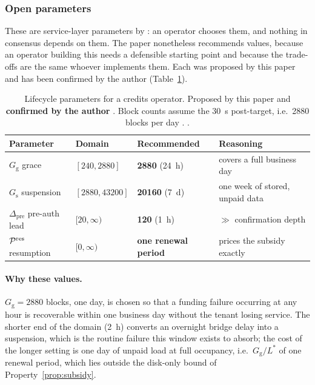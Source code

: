 \subsubsection{Open parameters}
\label{sec:paying:open}

These are service-layer parameters by : an operator chooses them, and
nothing in consensus depends on them. The paper nonetheless recommends values, because an operator
building this needs a defensible starting point and because the trade-offs are the same whoever
implements them. Each was proposed by this paper and has been confirmed by the author
(Table~\ref{tab:credit-params}).

\begin{table}[H]
\centering\footnotesize
\caption{Lifecycle parameters for a credits operator. Proposed by this paper and \textbf{confirmed
by the author} . Block counts assume the
\SI{30}{\second} post-\PoN target, i.e.\ \num{2880} blocks per day
. \planned.}
\label{tab:credit-params}
\begin{tabular}{@{}llll@{}}
\toprule
Parameter & Domain & \textbf{Recommended} & Reasoning \\
\midrule
$G_{\mathrm{g}}$ grace & $[240, 2880]$ & \textbf{\num{2880}} (\SI{24}{\hour}) & covers a full
business day \\
$G_{\mathrm{s}}$ suspension & $[2880, 43200]$ & \textbf{\num{20160}} (\SI{7}{\day}) & one week of
stored, unpaid data \\
$\Delta_{\mathrm{pre}}$ pre-auth lead & $[20, \infty)$ & \textbf{\num{120}} (\SI{1}{\hour}) &
$\gg$ confirmation depth \\
$\mathcal{P}^{\mathrm{res}}$ resumption & $[0, \infty)$ & \textbf{one renewal period} & prices the
subsidy exactly \\
\bottomrule
\end{tabular}
\end{table}

\paragraph{Why these values.}
$G_{\mathrm{g}} = \num{2880}$ blocks, one day, is chosen so that a funding failure occurring at any
hour is recoverable within one business day without the tenant losing service. The shorter end of the
domain (\SI{2}{\hour}) converts an overnight bridge delay into a suspension, which is the routine
failure this window exists to absorb; the cost of the longer setting is one day of unpaid load at
full occupancy, i.e.\ $G_{\mathrm{g}}/L^{\ast}$ of one renewal period, which lies outside the disk-only
bound of Property~\ref{prop:subsidy}.

